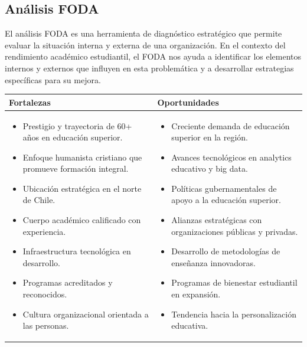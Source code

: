 \documentclass[12pt,letterpaper]{report}
\begin{document}
\subsection{Análisis FODA}

El análisis FODA es una herramienta de diagnóstico estratégico que permite evaluar la situación interna y externa de una organización. En el contexto del rendimiento académico estudiantil, el FODA nos ayuda a identificar los elementos internos y externos que influyen en esta problemática y a desarrollar estrategias específicas para su mejora.

\begin{table}[H]
    \centering
    \begin{tabular}{|p{}|p{}|}
        \hline
        \textbf{Fortalezas} & \textbf{Oportunidades} \\
        \hline
        \begin{itemize}
            \item Prestigio y trayectoria de 60+ años en educación superior.
            \item Enfoque humanista cristiano que promueve formación integral.
            \item Ubicación estratégica en el norte de Chile.
            \item Cuerpo académico calificado con experiencia.
            \item Infraestructura tecnológica en desarrollo.
            \item Programas acreditados y reconocidos.
            \item Cultura organizacional orientada a las personas.
        \end{itemize} & 
        \begin{itemize}
            \item Creciente demanda de educación superior en la región.
            \item Avances tecnológicos en analytics educativo y big data.
            \item Políticas gubernamentales de apoyo a la educación superior.
            \item Alianzas estratégicas con organizaciones públicas y privadas.
            \item Desarrollo de metodologías de enseñanza innovadoras.
            \item Programas de bienestar estudiantil en expansión.
            \item Tendencia hacia la personalización educativa.

\end{itemize}
\end{tabular}
\end{table}
\end{document}
